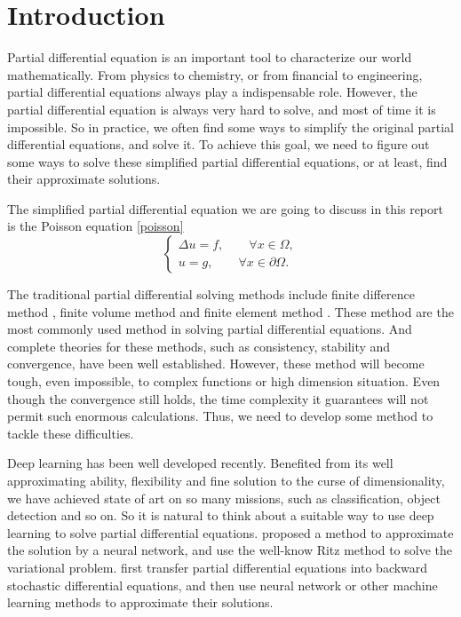 \documentclass{article}
\begin{document}
\section{Introduction}
\par Partial differential equation \cite{evans1998partial} is an important tool to characterize our world mathematically. From physics to chemistry, or from financial to engineering, partial differential equations always play a indispensable role. However, the partial differential equation is always very hard to solve, and most of time it is impossible. So in practice, we often find some ways to simplify the original partial differential equations, and solve it. To achieve this goal, we need to figure out some ways to solve these simplified partial differential equations, or at least, find their approximate solutions.
\par The simplified partial differential equation we are going to discuss in this report is the Poisson equation 
\eqref{poisson}
\begin{equation}\label{poisson}
	\begin{cases}
		\Delta u = f, \qquad\forall x\in\Omega,\\
		u = g, \qquad\forall x\in\partial\Omega.
	\end{cases}
\end{equation}
\par The traditional partial differential solving methods include finite difference method \cite{strikwerda2004finite}, finite volume method \cite{versteeg2007introduction} and finite element method \cite{brenner2007mathematical}. These method are the most commonly used method in solving partial differential equations. And complete theories for these methods, such as consistency, stability and convergence, have been well established. However, these method will become tough, even impossible, to complex functions or high dimension situation. Even though the convergence still holds, the time complexity it guarantees will not permit such enormous calculations. Thus, we need to develop some method to tackle these difficulties.
\par Deep learning \cite{lecun2015deep} has been well developed recently. Benefited from its well approximating ability, flexibility and fine solution to the curse of dimensionality, we have achieved state of art on so many missions, such as classification, object detection and so on. So it is natural to think about a suitable way to use deep learning to solve partial differential equations. \cite{yu2017deep} proposed a method to approximate the solution by a neural network, and use the well-know Ritz method to solve the variational problem. \cite{1707.02568}\cite{weinan2017deep}\cite{beck2017machine} first transfer partial differential equations into backward stochastic differential equations, and then use neural network or other machine learning methods to approximate their solutions.
\end{document}

